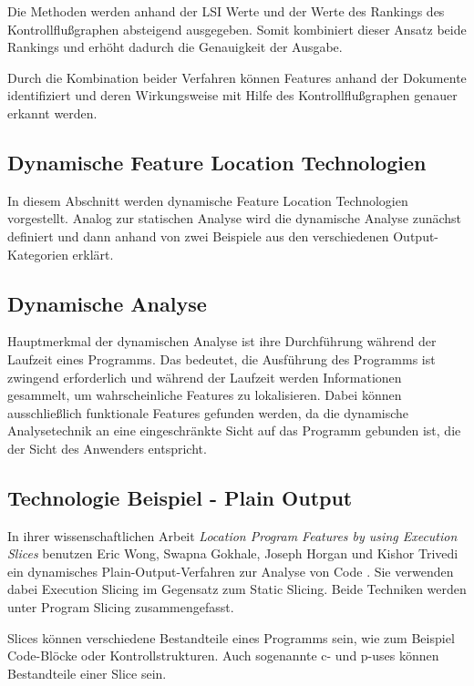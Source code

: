 \documentclass[runningheads,a4paper]{llncs}
\begin{document}
Die Methoden werden anhand der \ac{LSI} Werte und der Werte des Rankings des Kontrollflußgraphen absteigend ausgegeben. Somit kombiniert dieser Ansatz beide Rankings und erhöht dadurch die Genauigkeit der Ausgabe.

Durch die Kombination beider Verfahren können Features anhand der Dokumente identifiziert und deren Wirkungsweise mit Hilfe des Kontrollflußgraphen genauer erkannt werden.

\subsection{Dynamische Feature Location Technologien}

In diesem Abschnitt werden dynamische Feature Location Technologien vorgestellt. Analog zur statischen Analyse wird die dynamische Analyse zunächst definiert und dann anhand von zwei Beispiele aus den verschiedenen Output-Kategorien erklärt.

\subsection*{Dynamische Analyse}

Hauptmerkmal der dynamischen Analyse ist ihre Durchführung während der Laufzeit eines Programms. Das bedeutet, die Ausführung des Programms ist zwingend erforderlich und während der Laufzeit werden Informationen gesammelt, um wahrscheinliche Features zu lokalisieren. Dabei können ausschließlich funktionale Features gefunden werden, da die dynamische Analysetechnik an eine eingeschränkte Sicht auf das Programm gebunden ist, die der Sicht des Anwenders entspricht. 

\subsection*{Technologie Beispiel - Plain Output}

In ihrer wissenschaftlichen Arbeit \textit{Location Program Features by using Execution Slices} benutzen Eric Wong, Swapna Gokhale, Joseph Horgan und Kishor Trivedi ein dynamisches Plain-Output-Verfahren zur Analyse von Code \cite{Executionslices}. Sie verwenden dabei Execution Slicing im Gegensatz zum Static Slicing. Beide Techniken werden unter Program Slicing zusammengefasst.

Slices können verschiedene Bestandteile eines Programms sein, wie zum Beispiel Code-Blöcke oder Kontrollstrukturen. Auch sogenannte c- und p-uses können Bestandteile einer Slice sein.
\end{document}
